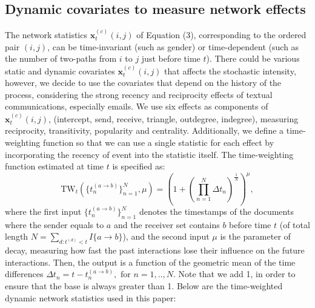 \documentclass[a4paper]{article}
\begin{document}
 \subsection{Dynamic covariates to measure network effects} \label{subsec: Dynamic covariates}
The network statistics $\boldsymbol{x}^{(c)}_t(i, j)$ of Equation (3), corresponding to the ordered pair $(i, j)$, can be time-invariant (such as gender) or time-dependent (such as the number of two-paths from $i$ to $j$ just before time $t$). There could be various static and dynamic covariates $\boldsymbol{x}^{(c)}_t(i, j)$ that affects the stochastic intensity, however, we decide to use the covariates that depend on the history of the process, considering the strong recency and reciprocity effects of textual communications, especially emails.
 We use six effects as components of $\boldsymbol{x}^{(c)}_t(i, j)$, (intercept, send, receive, triangle, outdegree, indegree), measuring reciprocity, transitivity, popularity and centrality. Additionally, we define a time-weighting function so that we can use a single statistic for each effect by incorporating the recency of event into the statistic itself. The time-weighting function estimated at time $t$ is specified as:
 \begin{equation}
 \mbox{TW}_t(\{t_n^{(a\rightarrow b)}\}_{n=1}^N, \mu) = (1+(\prod\limits_{n=1}^N\Delta t_n)^{\frac{1}{N}})^\mu,
 \end{equation}
 where the first input $\{t_n^{(a\rightarrow b)}\}_{n=1}^N$ denotes the timestamps of the documents where the sender equals to $a$ and the receiver set contains $b$ before time $t$ (of total length $N = \sum_{d: t^{(d)}<t} I\{a\rightarrow b\}$), and the second input $\mu$ is the parameter of decay, measuring how fast the past interactions lose their influence on the future interactions. Then, the output is a function of the geometric mean of the time differences $\Delta t_n=t-t_n^{(a\rightarrow b)}, \mbox{ for } n=1,..,N$. Note that we add 1, in order to ensure that the base is always greater than 1. Below are the time-weighted dynamic network statistics used in this paper:\\
\end{document}
